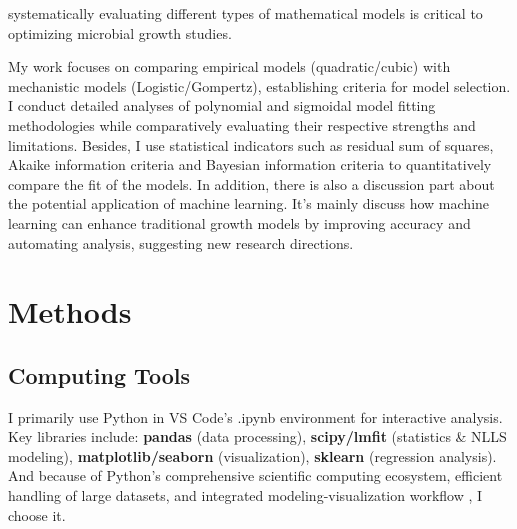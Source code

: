 \documentclass[11pt]{article}
\begin{document}
systematically evaluating different types of mathematical models is critical to optimizing microbial growth studies. 

My work focuses on comparing empirical models (quadratic/cubic) with mechanistic models (Logistic/Gompertz), establishing criteria for model selection. I conduct detailed analyses of polynomial and sigmoidal model fitting methodologies while comparatively evaluating their respective strengths and limitations. Besides, I use statistical indicators such as residual sum of squares, Akaike information criteria and Bayesian information criteria to quantitatively compare the fit of the models. In addition, there is also a  discussion part about the potential application of machine learning. It’s mainly discuss how machine learning can enhance traditional growth models by improving accuracy and automating analysis, suggesting new research directions.


\section{Methods}

\subsection{Computing Tools}
I primarily use Python in VS Code's .ipynb environment for interactive analysis. Key libraries include: \textbf{pandas} (data processing), \textbf{scipy/lmfit} (statistics \& NLLS modeling), \textbf{matplotlib/seaborn} (visualization), \textbf{sklearn} (regression analysis). And because of Python’s comprehensive scientific computing ecosystem, efficient handling of large datasets, and integrated modeling-visualization workflow \citep{Filguiera2017}, I choose it.
\end{document}
